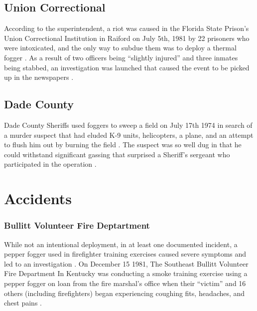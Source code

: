 \documentclass[
  11pt,
]{krantz}
\begin{document}
\hypertarget{union-correctional}{%
\section*{Union Correctional}\label{union-correctional}}


According to the superintendent, a riot was caused in the Florida State Prison's Union Correctional Institution in Raiford on July 5th, 1981 by 22 prisoners who were intoxicated, and the only way to subdue them was to deploy a thermal fogger \citep{TallahasseeDemocrat1981_07_07}.
As a result of two officers being ``slightly injured'' and three inmates being stabbed, an investigation was launched that caused the event to be picked up in the newspapers \citep{TallahasseeDemocrat1981_07_07}.

\hypertarget{dade-county}{%
\section*{Dade County}\label{dade-county}}


Dade County Sheriffs used foggers to sweep a field on July 17th 1974 in search of a murder suspect that had eluded K-9 units, helicopters, a plane, and an attempt to flush him out by burning the field \citep{TampaBayTimes1974_07_18}.
The suspect was so well dug in that he could withstand significant gassing that surprised a Sheriff's sergeant who participated in the operation \citep{TampaBayTimes1974_07_18}.

\hypertarget{accidents}{%
\chapter*{Accidents}\label{accidents}}


\hypertarget{bullitt-volunteer-fire-deptartment}{%
\subsection*{Bullitt Volunteer Fire Deptartment}\label{bullitt-volunteer-fire-deptartment}}


While not an intentional deployment, in at least one documented incident, a pepper fogger used in firefighter training exercises caused severe symptoms and led to an investigation \citep{Judd1981}.
On December 15 1981, The Southeast Bullitt Volunteer Fire Department In Kentucky was conducting a smoke training exercise using a pepper fogger on loan from the fire marshal's office when their ``victim'' and 16 others (including firefighters) began experiencing coughing fits, headaches, and chest pains \citep{Judd1981}.
\end{document}
